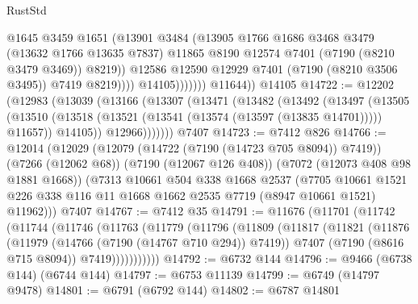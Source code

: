 \begin{lexlean}{RustStd}
\begin{coremodule}
                              @1645
                              @3459
                              @1651
                              (@13901
                                @3484
                                (@13905
                                  @1766
                                  @1686
                                  @3468
                                  @3479
                                  (@13632 @1766 @13635 @7837)
                                  @11865
                                  @8190
                                  @12574
                                  @7401
                                  (@7190 (@8210 @3479 @3469))
                                  @8219))
                              @12586
                              @12590
                              @12929
                              @7401
                              (@7190 (@8210 @3506 @3495))
                              @7419
                              @8219))))
                      @14105)))))))
        @11644))
    @14105
@14722 := @12202
    (@12983
      (@13039
        (@13166
          (@13307
            (@13471
              (@13482
                (@13492
                  (@13497
                    (@13505
                      (@13510 (@13518 (@13521 (@13541 (@13574 (@13597 (@13835 @14701))))) @11657))
                      @14105))
                  @12966)))))))
    @7407
@14723 := @7412 @826
@14766 := @12014
    (@12029
      (@12079 (@14722 (@7190 (@14723 @705 @8094)) @7419))
      (@7266 (@12062 @68))
      (@7190 (@12067 @126 @408))
      (@7072 (@12073 @408 @98 @1881 @1668))
      (@7313
        @10661
        @504
        @338
        @1668
        @2537
        (@7705
          @10661
          @1521
          @226
          @338
          @116
          @11
          @1668
          @1662
          @2535
          @7719
          (@8947 @10661 @1521)
          @11962)))
    @7407
@14767 := @7412 @35
@14791 := @11676
    (@11701
      (@11742
        (@11744
          (@11746
            (@11763
              (@11779
                (@11796
                  (@11809
                    (@11817
                      (@11821
                        (@11876
                          (@11979 (@14766 (@7190 (@14767 @710 @294)) @7419))
                          @7407
                          (@7190 (@8616 @715 @8094))
                          @7419)))))))))))
@14792 := @6732 @144
@14796 := @9466 (@6738 @144) (@6744 @144)
@14797 := @6753 @11139
@14799 := @6749 (@14797 @9478)
@14801 := @6791 (@6792 @144)
@14802 := @6787 @14801

\end{coremodule}
\end{lexlean}
